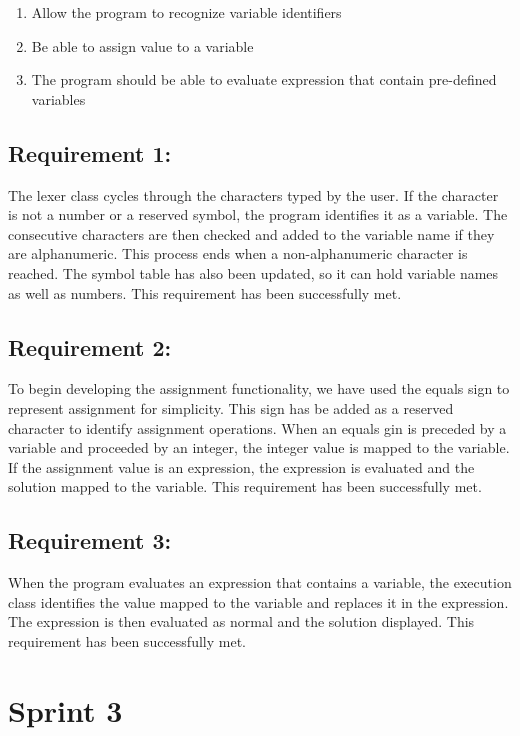 \documentclass[a4paper, oneside, 11pt]{report}
\begin{document}
\begin{enumerate}
\item Allow the program to recognize variable identifiers
\item Be able to assign value to a variable
\item The program should be able to evaluate expression that contain pre-defined variables
\end{enumerate}

\subsection{Requirement 1:}

The lexer class cycles through the characters typed by the user. If the character is not a number or a reserved symbol, the program identifies it as a variable. The consecutive characters are then checked and added to the variable name if they are alphanumeric. This process ends when a non-alphanumeric character is reached.
The symbol table has also been updated, so it can hold variable names as well as numbers.
This requirement has been successfully met.

\subsection{Requirement 2:}

To begin developing the assignment functionality, we have used the equals sign to represent assignment for simplicity. This sign has be added as a reserved character to identify assignment operations. When an equals gin is preceded by a variable and proceeded by an integer, the integer value is mapped to the variable. If the assignment value is an expression, the expression is evaluated and the solution mapped to the variable.
This requirement has been successfully met.

\subsection{Requirement 3:}

When the program evaluates an expression that contains a variable, the execution class identifies the value mapped to the variable and replaces it in the expression. The expression is then evaluated as normal and the solution displayed.
This requirement has been successfully met.

\section{Sprint 3}
\end{document}
